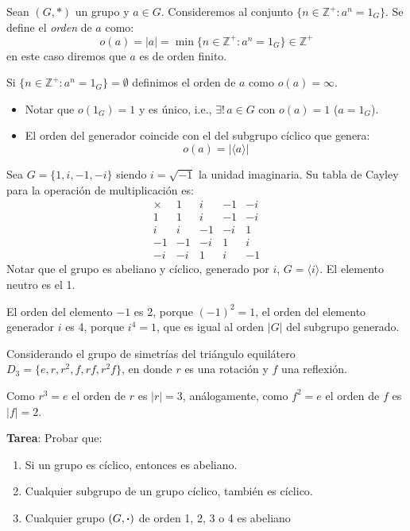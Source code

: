 	\begin{fmd-definition} 
		Sean $(G, *)$ un grupo y $a \in G$. Consideremos al conjunto $\{ n \in \mathbb{Z}^{+}: a^n = 1_G \}$. Se define el \textit{orden} de $a$ como:
		\[ o(a) = |a| = \min \{ n \in \mathbb{Z}^{+}: a^n = 1_G\} \in \mathbb{Z}^{+} \]
		en este caso diremos que $a$ es de orden finito.
		
		Si $\{ n \in \mathbb{Z}^{+}: a^n = 1_G\} = \emptyset$ definimos el orden de $a$ como $o(a) = \infty$.
	\end{fmd-definition}
	\begin{itemize}
		\item Notar que $o(1_G) = 1$ y es único, i.e., $\exists! \, a \in G$ con $o(a) = 1$ ($a = 1_G$).
		\item El orden del generador coincide con el del subgrupo cíclico que genera:
		\[ o(a) = |\langle a \rangle| \]
	\end{itemize}
	
	\begin{fmd-example}
		Sea $G = \{ 1, i, -1, -i \}$ siendo $i = \sqrt{-1}$ la unidad imaginaria. Su tabla de Cayley para la operación de multiplicación es:
		\[ \begin{array}{r|rrrr}
			\times & 1 & i & -1 & -i\\ \hline
			1 & 1 & i & -1 & -i\\
			i & i & -1 & -i & 1\\
			-1 & -1 & -i & 1 & i\\
			-i & -i & 1 & i & -1 
		\end{array} \]
		Notar que el grupo es abeliano y cíclico, generado por $i$, $G = \langle i \rangle$. El elemento neutro es el 1.
		
		El orden del elemento $-1$ es 2, porque $(-1)^2 = 1$, el orden del elemento generador $i$ es 4, porque $i^4 = 1$, que es igual al orden $|G|$ del subgrupo generado.
	\end{fmd-example}
	
	\begin{fmd-example}
		Considerando el grupo de simetrías del triángulo equilátero $D_3 = \{ e, r, r^2, f, rf, r^2f \}$, en donde $r$ es una rotación y $f$ una reflexión.
		
		Como $r^3 = e$ el orden de $r$ es $|r| = 3$, análogamente, como $f^2 = e$ el orden de $f$ es $|f| = 2$.
	\end{fmd-example}
	
	\textbf{Tarea}: Probar que:
	\begin{enumerate}
		\item Si un grupo es cíclico, entonces es abeliano.
		\item Cualquier subgrupo de un  grupo cíclico, también es cíclico.
		\item Cualquier grupo $(G, \boldsymbol{\cdot})$ de orden 1, 2, 3 o 4 es abeliano
	\end{enumerate}

